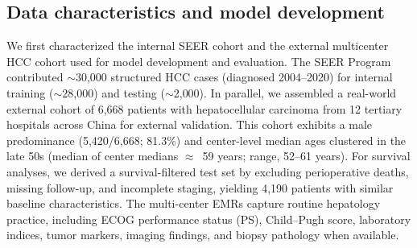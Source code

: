 \documentclass{article}
\begin{document}
\subsection{Data characteristics and model development}
We first characterized the internal SEER cohort and the external multicenter HCC cohort used for model development and evaluation. The SEER Program contributed \mbox{$\sim$30{,}000} structured HCC cases (diagnosed 2004--2020)  for internal training (\mbox{$\sim$28{,}000}) and testing (\mbox{$\sim$2{,}000}). In parallel, we assembled a real-world external cohort of 6,668 patients with hepatocellular carcinoma from 12 tertiary hospitals across China for external validation. This cohort exhibits a male predominance (5,420/6,668; 81.3\%) and center-level median ages clustered in the late 50s (median of center medians $\approx$\ 59 years; range, 52--61 years). 
For survival analyses, we derived a survival-filtered test set by excluding perioperative deaths, missing follow-up, and incomplete staging, yielding 4{,}190 patients with similar baseline characteristics. The multi-center EMRs capture routine hepatology practice, including ECOG performance status (PS), Child--Pugh score, laboratory indices, tumor markers, imaging findings, and biopsy pathology when available. 
\end{document}
